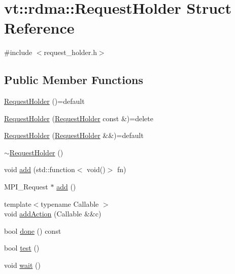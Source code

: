 \hypertarget{structvt_1_1rdma_1_1_request_holder}{}\section{vt\+:\+:rdma\+:\+:Request\+Holder Struct Reference}
\label{structvt_1_1rdma_1_1_request_holder}


{\ttfamily \#include $<$request\+\_\+holder.\+h$>$}

\subsection*{Public Member Functions}
\begin{DoxyCompactItemize}
\item 
\hyperlink{structvt_1_1rdma_1_1_request_holder_a3c892c8221207bfc7039770d4fd03dab}{Request\+Holder} ()=default
\item 
\hyperlink{structvt_1_1rdma_1_1_request_holder_a23ee7c46fc8ebdd804d395eedd0c9cd6}{Request\+Holder} (\hyperlink{structvt_1_1rdma_1_1_request_holder}{Request\+Holder} const \&)=delete
\item 
\hyperlink{structvt_1_1rdma_1_1_request_holder_a90a5bd5c4e43ac566224b694768c1417}{Request\+Holder} (\hyperlink{structvt_1_1rdma_1_1_request_holder}{Request\+Holder} \&\&)=default
\item 
\hyperlink{structvt_1_1rdma_1_1_request_holder_a3853124a44bcbf4c3446f7d68fdfa0ed}{$\sim$\+Request\+Holder} ()
\item 
void \hyperlink{structvt_1_1rdma_1_1_request_holder_a3d4c6399e1b7a28fd6bfceccce5fc506}{add} (std\+::function$<$ void()$>$ fn)
\item 
M\+P\+I\+\_\+\+Request $\ast$ \hyperlink{structvt_1_1rdma_1_1_request_holder_ae93f67442bf8ce1ff724d49a2c9b9e0f}{add} ()
\item 
{\footnotesize template$<$typename Callable $>$ }\\void \hyperlink{structvt_1_1rdma_1_1_request_holder_a1cfecd1b2c71b179683a13a4cd920419}{add\+Action} (Callable \&\&c)
\item 
bool \hyperlink{structvt_1_1rdma_1_1_request_holder_aa75a051ff0517bde8ccbf9e3986c0b5d}{done} () const
\item 
bool \hyperlink{structvt_1_1rdma_1_1_request_holder_ae363ac2a5fcee1fed9fc1d9393d69981}{test} ()
\item 
void \hyperlink{structvt_1_1rdma_1_1_request_holder_ac39a770edd579e49cf95f5238e5aabb6}{wait} ()
\end{DoxyCompactItemize}
